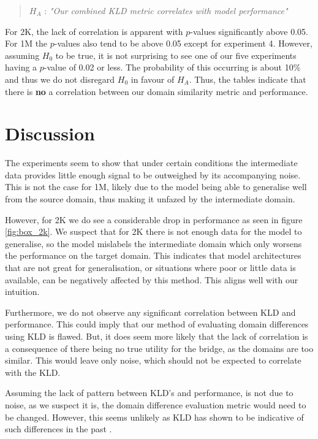\documentclass[11pt,a4paper]{article}
\begin{document}
\begin{quote}
    $H_A$ : \textit{"Our combined KLD metric correlates with model performance"}
\end{quote}

For 2K, the lack of correlation is apparent with $p$-values significantly above 0.05. For 1M the $p$-values also tend to be above 0.05 except for experiment 4.
However, assuming $H_0$ to be true, it is not surprising to see one of our five experiments having a $p$-value of 0.02 or less. The probability of this occurring is about 10\% and thus we do not disregard $H_0$ in favour of $H_A$.
Thus, the tables indicate that there is \textbf{no} a correlation between our domain similarity metric and performance. 

\section*{Discussion}

The experiments seem to show that under certain conditions the intermediate data provides little enough signal to be outweighed by its accompanying noise.
This is not the case for 1M, likely due to the model being able to generalise well from the source domain, thus making it unfazed by the intermediate domain.

However, for 2K we do see a considerable drop in performance as seen in figure \ref{fig:box_2k}. We suspect that for 2K there is not enough data for the model to generalise, so the model mislabels the intermediate domain which only worsens the performance on the target domain.
This indicates that model architectures that are not great for generalisation, or situations where poor or little data is available, can be negatively affected by this method. This aligns well with our intuition.

Furthermore, we do not observe any significant correlation between KLD and performance. This could imply that our method of evaluating domain differences using KLD is flawed.
But, it does seem more likely that the lack of correlation is a consequence of there being no true utility for the bridge, as the domains are too similar. This would leave only noise, which should not be expected to correlate with the KLD.

Assuming the lack of pattern between KLD's and performance, is not due to noise, as we suspect it is, the domain difference evaluation metric would need to be changed. However, this seems unlikely as KLD has shown to be indicative of such differences in the past \cite{van-asch-daelemans-2010-using}.
\end{document}
